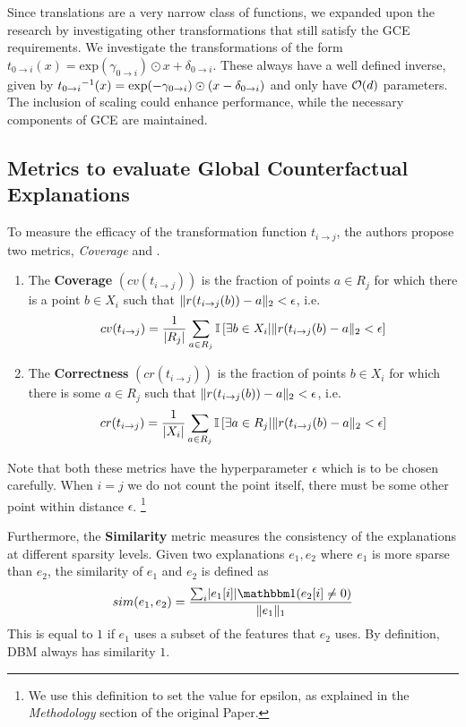 Since translations are a very narrow class of functions, we expanded upon the research by investigating other transformations that still satisfy the GCE requirements. We investigate the transformations of the form $t_{0 \to i}(x) = \mathrm{exp}(\gamma_{0 \to i}) \odot x + \delta_{0 \to i}$. These always have a well defined inverse, given by ${t_{0 \to i}}^{-1}(x) = \mathrm{exp}(-\gamma_{0 \to i}) \odot (x - \delta_{0 \to i})$ and only have $\mathcal{O}(d)$ parameters. The inclusion of scaling could enhance performance, while the necessary components of GCE are maintained.


\subsection{Metrics to evaluate Global Counterfactual Explanations}
\label{sec:metrics}
To measure the efficacy of the transformation function $t_{i \to j}$, the authors propose two metrics, \textit{Coverage} and . 
\begin{enumerate} \item The \textbf{Coverage} $\left(cv(t_{i \to j})\right)$ is the fraction of points $a \in R_j$ for which there is a point $b \in X_i$ such that $\lVert r(t_{i \to j}(b)) - a \rVert_2 < \epsilon$, i.e.
\begin{equation}
  cv(t_{i \to j}) = \frac{1}{|R_{j}|}\sum_{a \in R_{j}}\mathbb{I}\left[ \exists  b \in X_{i} | \lVert r(t_{i \to j}(b) - a \rVert_{2} < \epsilon \right]
\end{equation}
 \item The \textbf{Correctness} $\left(cr(t_{i\to j})\right)$  is the fraction of points $b \in X_i$ for which there is some $a \in R_j$ such that
 $\lVert r(t_{i \to j}(b)) - a \rVert_2 < \epsilon$, i.e.
 \begin{equation}
  cr(t_{i \to j}) = \frac{1}{|X_{i}|}\sum_{a \in R_{j}}\mathbb{I}\left[ \exists  a \in R_{j} | \lVert r(t_{i \to j}(b) - a \rVert_{2} < \epsilon \right]
\end{equation}
\end{enumerate}
Note that both these metrics have the hyperparameter $\epsilon$ which is to be chosen carefully. When $i=j$ we do not count the point itself, there must be some other point within distance $\epsilon$. \footnote{We use this definition to set the value for epsilon, as explained in the \textit{Methodology} section of the original Paper.}

Furthermore, the \textbf{Similarity} metric measures the consistency of the explanations at different sparsity levels. Given two explanations $e_1, e_2$ where $e_1$ is more sparse than $e_2$, the similarity of $e_1$ and $e_2$ is defined as
\begin{equation}
 sim(e_1, e_2) = \frac{\sum_i \abs{e_1[i]} \indc (e_2[i] \neq 0)}{\norm{e_1}_1}
\end{equation}
This is equal to $1$ if $e_1$ uses a subset of the features that $e_2$ uses. By definition, DBM always has similarity $1$.

